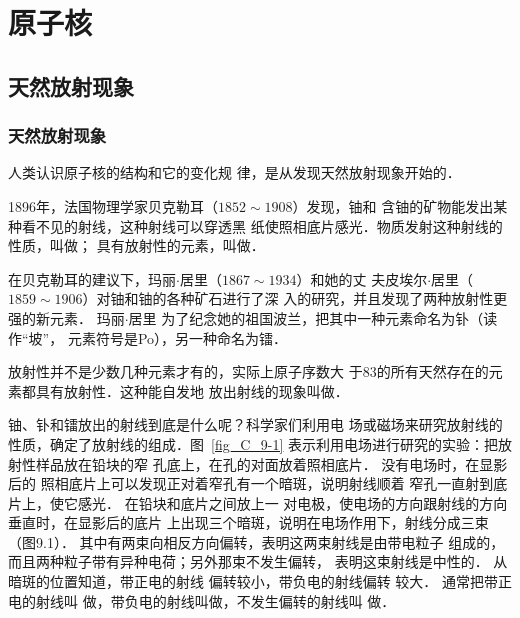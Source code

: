 \chapter{原子核}\label{chapter-atomic-nucleus}

\section{天然放射现象}

\subsection{天然放射现象}

人类认识原子核的结构和它的变化规
律，是从发现天然放射现象开始的．

1896年，法国物理学家贝克勒耳（$1852 \sim 1908$）发现，铀和
含铀的矿物能发出某种看不见的射线，这种射线可以穿透黑
纸使照相底片感光．物质发射这种射线的性质，叫做；
具有放射性的元素，叫做．

在贝克勒耳的建议下，玛丽$\cdot$居里（$1867 \sim 1934$）和她的丈
夫皮埃尔$\cdot$居里（$1859 \sim 1906$）对铀和铀的各种矿石进行了深
入的研究，并且发现了两种放射性更强的新元素．
玛丽$\cdot$居里
为了纪念她的祖国波兰，把其中一种元素命名为钋（读作“坡”，
元素符号是Po），另一种命名为镭．

放射性并不是少数几种元素才有的，实际上原子序数大
于83的所有天然存在的元素都具有放射性．这种能自发地
放出射线的现象叫做．

铀、钋和镭放出的射线到底是什么呢？科学家们利用电
场或磁场来研究放射线的性质，确定了放射线的组成．图~\ref{fig_C_9-1} 
表示利用电场进行研究的实验：把放射性样品放在铅块的窄
孔底上，在孔的对面放着照相底片．
没有电场时，在显影后的
照相底片上可以发现正对着窄孔有一个暗斑，说明射线顺着
窄孔一直射到底片上，使它感光．
在铅块和底片之间放上一
对电极，使电场的方向跟射线的方向垂直时，在显影后的底片
上出现三个暗斑，说明在电场作用下，射线分成三束（图9.1）．
其中有两束向相反方向偏转，表明这两束射线是由带电粒子
组成的，而且两种粒子带有异种电荷；另外那束不发生偏转，
表明这束射线是中性的．
从暗斑的位置知道，带正电的射线
偏转较小，带负电的射线偏转
较大．
通常把带正电的射线叫
做，带负电的射线叫做，不发生偏转的射线叫
做．

